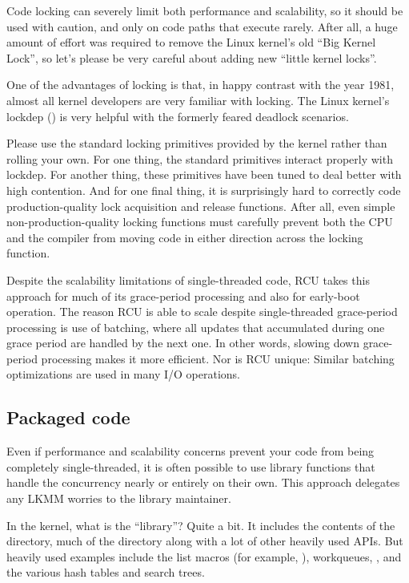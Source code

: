 Code locking can severely limit both performance and scalability, so it
should be used with caution, and only on code paths that execute rarely.
After all, a huge amount of effort was required to remove the Linux
kernel's old ``Big Kernel Lock'', so let's please be very careful about
adding new ``little kernel locks''.

One of the advantages of locking is that, in happy contrast with the
year 1981, almost all kernel developers are very familiar with locking.
The Linux kernel's lockdep () is very helpful with
the formerly feared deadlock scenarios.

Please use the standard locking primitives provided by the kernel rather
than rolling your own.
For one thing, the standard primitives interact properly with lockdep.
For another thing, these primitives have been tuned to deal better
with high contention.
And for one final thing, it is surprisingly hard to correctly code
production-quality lock acquisition and release functions.
After all, even simple non-production-quality locking functions must
carefully prevent both the CPU and the compiler from moving code in
either direction across the locking function.

Despite the scalability limitations of single-threaded code, RCU
takes this approach for much of its grace-period processing and also
for early-boot operation.
The reason RCU is able to scale despite single-threaded grace-period
processing is use of batching, where all updates that accumulated
during one grace period are handled by the next one.
In other words, slowing down grace-period processing makes it more
efficient.
Nor is RCU unique:
Similar batching optimizations are used in many I/O operations.


\subsection{Packaged code}

Even if performance and scalability concerns prevent your code from
being completely single-threaded, it is often possible to use library
functions that handle the concurrency nearly or entirely on their own.
This approach delegates any LKMM worries to the library maintainer.

In the kernel, what is the ``library''?
Quite a bit.
It includes the contents of the  directory, much of the
 directory along with a lot of other heavily
used APIs.
But heavily used examples include the list macros (for example,
), workqueues,
, and the various hash tables and search trees.


